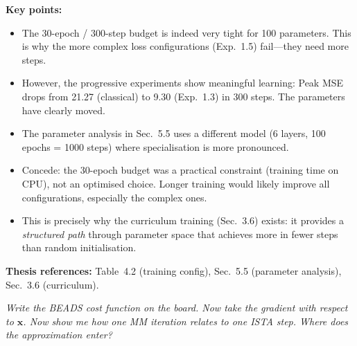 \documentclass[11pt, letterpaper]{article}
\newcounter{qcounter}
\newcommand{\question}[1]{%
  \stepcounter{qcounter}%
  \begin{questionbox}[Q\theqcounter]%
    \itshape #1%
  \end{questionbox}%
}
\begin{document}
\begin{answerbox}
\textbf{Key points:}
\begin{itemize}[nosep]
  \item The 30-epoch / 300-step budget is indeed very tight for
        100 parameters.  This is why the more complex loss
        configurations (Exp.~1.5) fail---they need more steps.
  \item However, the progressive experiments show meaningful
        learning: Peak MSE drops from 21.27 (classical) to 9.30
        (Exp.~1.3) in 300 steps.  The parameters have clearly moved.
  \item The parameter analysis in Sec.~5.5 uses a different model
        (6 layers, 100 epochs = 1000 steps) where specialisation
        is more pronounced.
  \item Concede: the 30-epoch budget was a practical constraint
        (training time on CPU), not an optimised choice.  Longer
        training would likely improve all configurations, especially
        the complex ones.
  \item This is precisely why the curriculum training (Sec.~3.6)
        exists: it provides a \emph{structured path} through parameter
        space that achieves more in fewer steps than random
        initialisation.
\end{itemize}
\textbf{Thesis references:} Table~4.2 (training config), Sec.~5.5 (parameter analysis), Sec.~3.6 (curriculum).
\end{answerbox}

\question{Write the BEADS cost function on the board.  Now take the
gradient with respect to $\mathbf{x}$.  Now show me how one MM
iteration relates to one ISTA step.  Where does the approximation
enter?}
\end{document}
